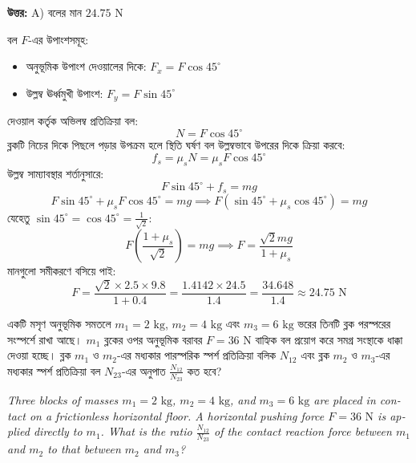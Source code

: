\documentclass[12pt, a4paper]{article}
\begin{document}
\vspace{0.5em}
\begin{tcolorbox}[answerbox]
\textbf{\color{success} উত্তর:} A) বলের মান $24.75\text{ N}$
\end{tcolorbox}
\vspace{1em}

\begin{tcolorbox}[solutionbox={সমাধান (Solution)}]
\noindent
বল $F$-এর উপাংশসমূহ:
\begin{itemize}[leftmargin=1.5em, itemsep=0.2em]
    \item অনুভূমিক উপাংশ দেওয়ালের দিকে: $F_x = F \cos 45^\circ$
    \item উল্লম্ব ঊর্ধ্বমুখী উপাংশ: $F_y = F \sin 45^\circ$
\end{itemize}
দেওয়াল কর্তৃক অভিলম্ব প্রতিক্রিয়া বল:
$$N = F \cos 45^\circ$$
ব্লকটি নিচের দিকে পিছলে পড়ার উপক্রম হলে স্থিতি ঘর্ষণ বল উল্লম্বভাবে উপরের দিকে ক্রিয়া করবে:
$$f_s = \mu_s N = \mu_s F \cos 45^\circ$$
উল্লম্ব সাম্যাবস্থার শর্তানুসারে:
$$F \sin 45^\circ + f_s = mg$$
$$F \sin 45^\circ + \mu_s F \cos 45^\circ = mg \implies F (\sin 45^\circ + \mu_s \cos 45^\circ) = mg$$
যেহেতু $\sin 45^\circ = \cos 45^\circ = \frac{1}{\sqrt{2}}$:
$$F \left(\frac{1 + \mu_s}{\sqrt{2}}\right) = mg \implies F = \frac{\sqrt{2} mg}{1 + \mu_s}$$
মানগুলো সমীকরণে বসিয়ে পাই:
$$F = \frac{\sqrt{2} \times 2.5 \times 9.8}{1 + 0.4} = \frac{1.4142 \times 24.5}{1.4} = \frac{34.648}{1.4} \approx 24.75\text{ N}$$
\end{tcolorbox}
\vspace{1em}

\begin{tcolorbox}[questionbox={প্রশ্ন (Question) 20}]
\noindent
একটি মসৃণ অনুভূমিক সমতলে $m_1 = 2\text{ kg}$, $m_2 = 4\text{ kg}$ এবং $m_3 = 6\text{ kg}$ ভরের তিনটি ব্লক পরস্পরের সংস্পর্শে রাখা আছে। $m_1$ ব্লকের ওপর অনুভূমিক বরাবর $F = 36\text{ N}$ বাহ্যিক বল প্রয়োগ করে সমগ্র সংস্থাকে ধাক্কা দেওয়া হচ্ছে। ব্লক $m_1$ ও $m_2$-এর মধ্যকার পারস্পরিক স্পর্শ প্রতিক্রিয়া বলিক $N_{12}$ এবং ব্লক $m_2$ ও $m_3$-এর মধ্যকার স্পর্শ প্রতিক্রিয়া বল $N_{23}$-এর অনুপাত $\frac{N_{12}}{N_{23}}$ কত হবে?

\vspace{0.8em}
\begin{english}
\noindent\textit{\color{darkgray}
Three blocks of masses $m_1 = 2\text{ kg}$, $m_2 = 4\text{ kg}$, and $m_3 = 6\text{ kg}$ are placed in contact on a frictionless horizontal floor. A horizontal pushing force $F = 36\text{ N}$ is applied directly to $m_1$. What is the ratio $\frac{N_{12}}{N_{23}}$ of the contact reaction force between $m_1$ and $m_2$ to that between $m_2$ and $m_3$?
}
\end{english}
\end{tcolorbox}
\end{document}
